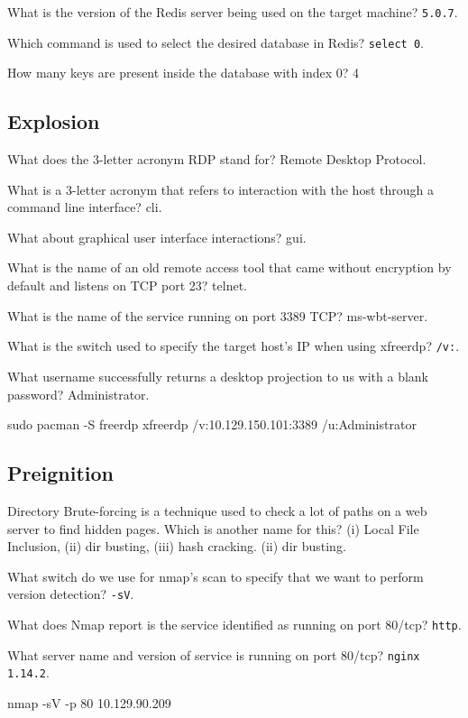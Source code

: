 \documentclass[a4paper,12pt]{article}
\newcommand{\bashinline}[1]{\texttt{#1}}
\begin{document}
What is the version of the Redis server being used on the target machine? \bashinline{5.0.7}.

Which command is used to select the desired database in Redis? \bashinline{select 0}.

How many keys are present inside the database with index 0? 4

\subsection{Explosion \faWindows}
What does the 3-letter acronym RDP stand for? Remote Desktop Protocol.

What is a 3-letter acronym that refers to interaction with the host through a command line interface? cli.

What about graphical user interface interactions? gui.

What is the name of an old remote access tool that came without encryption by default and listens on TCP port 23? telnet.

What is the name of the service running on port 3389 TCP? ms-wbt-server.

What is the switch used to specify the target host's IP when using xfreerdp? \bashinline{/v:}.

What username successfully returns a desktop projection to us with a blank password? Administrator.
\begin{bash}
sudo pacman -S freerdp
xfreerdp /v:10.129.150.101:3389 /u:Administrator
\end{bash}

\subsection{Preignition \faLinux}

Directory Brute-forcing is a technique used to check a lot of paths on a web server to find hidden pages. Which is another name for this? (i) Local File Inclusion, (ii) dir busting, (iii) hash cracking. (ii) dir busting.

What switch do we use for nmap's scan to specify that we want to perform version detection? \bashinline{-sV}.

What does Nmap report is the service identified as running on port 80/tcp? \bashinline{http}.

What server name and version of service is running on port 80/tcp? \bashinline{nginx 1.14.2}.
\begin{bash}
nmap -sV -p 80 10.129.90.209
\end{bash}
\end{document}
